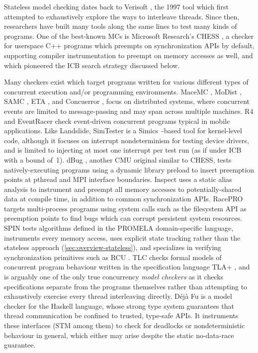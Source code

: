 Stateless model checking dates back to Verisoft \cite{verisoft},
the 1997 tool which first attempted to exhaustively explore the  ways to interleave threads.
Since then, researchers have built many tools along the same lines to test many kinds of programs.
One of the best-known MCs is Microsoft Research's CHESS \cite{chess},
a checker for userspace C++ programs which preempts on synchronization APIs by default,
supporting compiler instrumentation to preempt on memory accesses as well,
and which pioneered the ICB search strategy discussed below.

Many checkers exist which target programs written for various different types of
concurrent execution and/or programming environments.
MaceMC \cite{macemc}, MoDist \cite{modist}, SAMC \cite{samc}, ETA \cite{dbug-retreat}, and Concuerror \cite{concuerror},
focus on distributed systems, where concurrent events are limited to message-passing and may span across multiple machines.
R4 \cite{r4} and EventRacer \cite{eventracer} check event-driven concurrent programs typical in mobile applications.
Like Landslide, SimTester \cite{simtester} is a Simics~\cite{simics}-based tool for kernel-level code,
although it focuses on interrupt nondeterminism for testing device drivers,
and is limited to injecting at most one interrupt per test run (as if under ICB with a bound of~1).
%
dBug \cite{dbug-ssv}, another CMU original similar to CHESS,
tests natively-executing programs
using a dynamic library preload to insert preemption points at pthread and MPI interface boundaries.
Inspect \cite{inspect} uses a static alias analysis to instrument and preempt all memory accesses to potentially-shared data
at compile time, in addition to common synchronization APIs.
RacePRO~\cite{racepro} targets multi-process programs using system calls such as the filesystem API as preemption points
to find bugs which can corrupt persistent system resources.
SPIN \cite{spin} tests algorithms defined in the PROMELA domain-specific language,
instruments every memory access,
uses explicit state tracking rather than the stateless approach (\cref{sec:overview-stateless}),
and specializes in verifying synchronization primitives such as RCU \cite{rcu}.
TLC \cite{tlc} checks formal models of concurrent program behaviour
written in the specification language TLA+ \cite{tlaplus},
and is arguably one of the only true concurrency {\em model checkers}
as it checks specifications separate from the programs themselves
rather than attempting to exhaustively exercise every thread interleaving directly.
%
D\'{e}j\`{a} Fu \cite{dejafu} is a model checker
for the Haskell language,
whose strong type system guarantees that thread communication be confined to trusted, type-safe APIs.
It instruments these interfaces (STM among them)
to check for deadlocks or nondeterministic behaviour in general,
which either may arise despite the static no-data-race guarantee.

